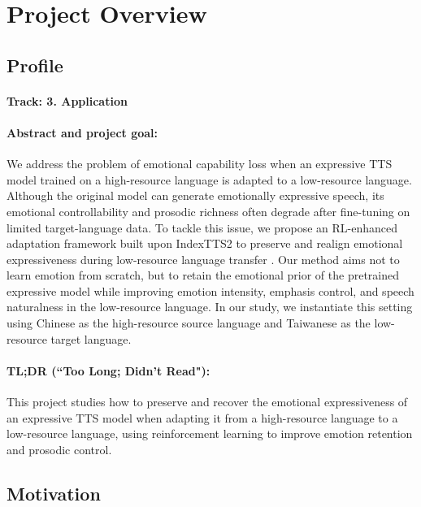 \section{Project Overview}
\label{section:intro}

\subsection{Profile}

\paragraph{Track: 3. Application}

\paragraph{Abstract and project goal:}
We address the problem of emotional capability loss when an expressive TTS model trained on a high-resource language is adapted to a low-resource language. Although the original model can generate emotionally expressive speech, its emotional controllability and prosodic richness often degrade after fine-tuning on limited target-language data. To tackle this issue, we propose an RL-enhanced adaptation framework built upon IndexTTS2 to preserve and realign emotional expressiveness during low-resource language transfer \citep{Zhou2025IndexTTS2AB}. Our method aims not to learn emotion from scratch, but to retain the emotional prior of the pretrained expressive model while improving emotion intensity, emphasis control, and speech naturalness in the low-resource language. In our study, we instantiate this setting using Chinese as the high-resource source language and Taiwanese as the low-resource target language.

\paragraph{TL;DR (``Too Long; Didn't Read"):}
This project studies how to preserve and recover the emotional expressiveness of an expressive TTS model when adapting it from a high-resource language to a low-resource language, using reinforcement learning to improve emotion retention and prosodic control.

\subsection{Motivation}


